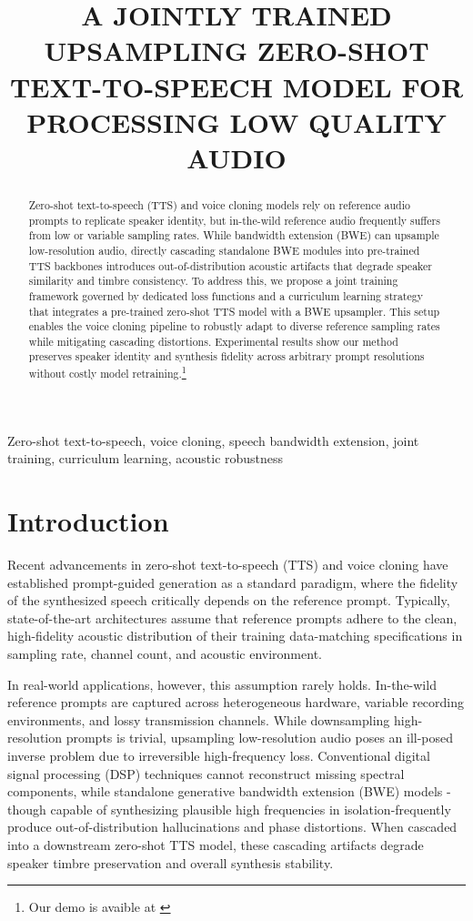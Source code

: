 \documentclass{article}
\title{A JOINTLY TRAINED UPSAMPLING ZERO-SHOT TEXT-TO-SPEECH MODEL FOR PROCESSING LOW QUALITY AUDIO}
\begin{document}
%
\maketitle
%
\begin{abstract}
Zero-shot text-to-speech (TTS) and voice cloning models rely on reference audio prompts to replicate speaker identity, but in-the-wild reference audio frequently suffers from low or variable sampling rates. While bandwidth extension (BWE) can upsample low-resolution audio, directly cascading standalone BWE modules into pre-trained TTS backbones introduces out-of-distribution acoustic artifacts that degrade speaker similarity and timbre consistency. To address this, we propose a joint training framework governed by dedicated loss functions and a curriculum learning strategy that integrates a pre-trained zero-shot TTS model with a BWE upsampler. This setup enables the voice cloning pipeline to robustly adapt to diverse reference sampling rates while mitigating cascading distortions. Experimental results show our method preserves speaker identity and synthesis fidelity across arbitrary prompt resolutions without costly model retraining.\footnote{Our demo is avaible at \url{}}
\end{abstract}
%
\begin{keywords}
Zero-shot text-to-speech, voice cloning, speech bandwidth extension, joint training, curriculum learning, acoustic robustness
\end{keywords}
%
\section{Introduction}
\label{sec:intro}
Recent advancements in zero-shot text-to-speech (TTS) and voice cloning have established prompt-guided generation as a standard paradigm, where the fidelity of the synthesized speech critically depends on the reference prompt. Typically, state-of-the-art architectures \cite{zipvoice,valle} assume that reference prompts adhere to the clean, high-fidelity acoustic distribution of their training data-matching specifications in sampling rate, channel count, and acoustic environment.

In real-world applications, however, this assumption rarely holds. In-the-wild reference prompts are captured across heterogeneous hardware, variable recording environments, and lossy transmission channels. While downsampling high-resolution prompts is trivial, upsampling low-resolution audio poses an ill-posed inverse problem due to irreversible high-frequency loss. Conventional digital signal processing (DSP) techniques cannot reconstruct missing spectral components, while standalone generative bandwidth extension (BWE) models \cite{nvsr,anyband}-though capable of synthesizing plausible high frequencies in isolation-frequently produce out-of-distribution hallucinations and phase distortions. When cascaded into a downstream zero-shot TTS model, these cascading artifacts degrade speaker timbre preservation and overall synthesis stability.
\end{document}
